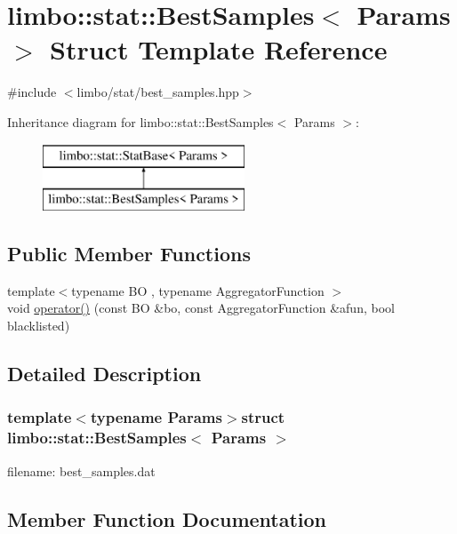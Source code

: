 \hypertarget{structlimbo_1_1stat_1_1_best_samples}{}\section{limbo\+:\+:stat\+:\+:Best\+Samples$<$ Params $>$ Struct Template Reference}
\label{structlimbo_1_1stat_1_1_best_samples}


{\ttfamily \#include $<$limbo/stat/best\+\_\+samples.\+hpp$>$}

Inheritance diagram for limbo\+:\+:stat\+:\+:Best\+Samples$<$ Params $>$\+:\begin{figure}[H]
\begin{center}
\leavevmode
\includegraphics[height=2.000000cm]{structlimbo_1_1stat_1_1_best_samples}
\end{center}
\end{figure}
\subsection*{Public Member Functions}
\begin{DoxyCompactItemize}
\item 
{\footnotesize template$<$typename B\+O , typename Aggregator\+Function $>$ }\\void \hyperlink{structlimbo_1_1stat_1_1_best_samples_a402f70a7663d3055ff618127443bc2dd}{operator()} (const B\+O \&bo, const Aggregator\+Function \&afun, bool blacklisted)
\end{DoxyCompactItemize}


\subsection{Detailed Description}
\subsubsection*{template$<$typename Params$>$struct limbo\+::stat\+::\+Best\+Samples$<$ Params $>$}

filename\+: {\ttfamily best\+\_\+samples.\+dat} 

\subsection{Member Function Documentation}
\hypertarget{structlimbo_1_1stat_1_1_best_samples_a402f70a7663d3055ff618127443bc2dd}{}
